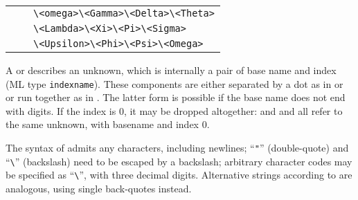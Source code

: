 \begin{isabellebody}
\begin{isamarkuptext}
\begin{center}
\begin{supertabular}{rcl}
          &   & \verb|\<omega>|\isa{{\isachardoublequote}\ \ {\isacharbar}\ \ {\isachardoublequote}}\verb|\<Gamma>|\isa{{\isachardoublequote}\ \ {\isacharbar}\ \ {\isachardoublequote}}\verb|\<Delta>|\isa{{\isachardoublequote}\ \ {\isacharbar}\ \ {\isachardoublequote}}\verb|\<Theta>|\isa{{\isachardoublequote}\ \ {\isacharbar}{\isachardoublequote}} \\
          &   & \verb|\<Lambda>|\isa{{\isachardoublequote}\ \ {\isacharbar}\ \ {\isachardoublequote}}\verb|\<Xi>|\isa{{\isachardoublequote}\ \ {\isacharbar}\ \ {\isachardoublequote}}\verb|\<Pi>|\isa{{\isachardoublequote}\ \ {\isacharbar}\ \ {\isachardoublequote}}\verb|\<Sigma>|\isa{{\isachardoublequote}\ \ {\isacharbar}{\isachardoublequote}} \\
          &   & \verb|\<Upsilon>|\isa{{\isachardoublequote}\ \ {\isacharbar}\ \ {\isachardoublequote}}\verb|\<Phi>|\isa{{\isachardoublequote}\ \ {\isacharbar}\ \ {\isachardoublequote}}\verb|\<Psi>|\isa{{\isachardoublequote}\ \ {\isacharbar}\ \ {\isachardoublequote}}\verb|\<Omega>| \\
  \end{supertabular}
  \end{center}

  A \hyperlink{syntax.var}{\mbox{}} or \hyperlink{syntax.typevar}{\mbox{}} describes an unknown,
  which is internally a pair of base name and index (ML type \verb|indexname|).  These components are either separated by a dot as in
   or  or run together as in .  The latter form is possible if the base name does not end
  with digits.  If the index is 0, it may be dropped altogether:
   and  and  all refer to the
  same unknown, with basename  and index 0.

  The syntax of \hyperlink{syntax.string}{\mbox{}} admits any characters, including
  newlines; ``\verb|"|'' (double-quote) and ``\verb|\|'' (backslash) need to be escaped by a backslash; arbitrary
  character codes may be specified as ``\verb|\|'',
  with three decimal digits.  Alternative strings according to
  \hyperlink{syntax.altstring}{\mbox{}} are analogous, using single back-quotes
  instead.


\end{isamarkuptext}
\end{isabellebody}
